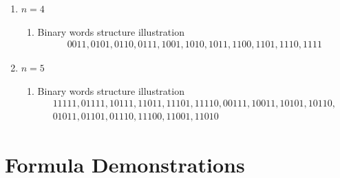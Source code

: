 \documentclass[a4paper,10pt]{article}
\begin{document}
\begin{enumerate}
	\item $n = 4$\\
	\begin{enumerate}
		\item Binary words structure illustration\\
		\[
		\boxed{
		\begin{gathered}
		0011, 0101, 0110, 0111, 1001, 1010, 1011, 1100, 1101, 1110, 1111
		\end{gathered}
		}
		\]
	\end{enumerate}
	
	\item $n = 5$\\
	\begin{enumerate}
		\item Binary words structure illustration\\
		\[
		\boxed{
		\begin{gathered}
		11111, 01111, 10111, 11011, 11101, 11110, 00111, 10011, 10101, 10110,\\ 		        01011, 01101, 01110, 11100, 11001, 11010 
		\end{gathered}
		}
		\]
	\end{enumerate}
\end{enumerate}
 
\section{Formula Demonstrations}
\end{document}
